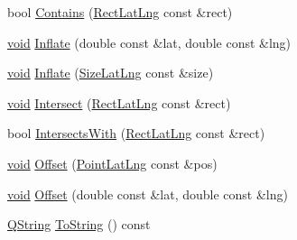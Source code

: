 \begin{DoxyCompactItemize}
\item 
bool \hyperlink{group___o_p_map_widget_gafd896574ac80e5ee28f536db3a8391a2}{\-Contains} (\hyperlink{structinternals_1_1_rect_lat_lng}{\-Rect\-Lat\-Lng} const \&rect)
\item 
\hyperlink{group___u_a_v_objects_plugin_ga444cf2ff3f0ecbe028adce838d373f5c}{void} \hyperlink{group___o_p_map_widget_gaff9d1cc5fb1f00965fad7de448ee3aa3}{\-Inflate} (double const \&lat, double const \&lng)
\item 
\hyperlink{group___u_a_v_objects_plugin_ga444cf2ff3f0ecbe028adce838d373f5c}{void} \hyperlink{group___o_p_map_widget_gab43105de3a7b0711e47f7e02e0359f2c}{\-Inflate} (\hyperlink{structinternals_1_1_size_lat_lng}{\-Size\-Lat\-Lng} const \&size)
\item 
\hyperlink{group___u_a_v_objects_plugin_ga444cf2ff3f0ecbe028adce838d373f5c}{void} \hyperlink{group___o_p_map_widget_ga829f6c41bb7332b5c596f417157972a7}{\-Intersect} (\hyperlink{structinternals_1_1_rect_lat_lng}{\-Rect\-Lat\-Lng} const \&rect)
\item 
bool \hyperlink{group___o_p_map_widget_ga3d1953efc67a3592589cff53c33e119a}{\-Intersects\-With} (\hyperlink{structinternals_1_1_rect_lat_lng}{\-Rect\-Lat\-Lng} const \&rect)
\item 
\hyperlink{group___u_a_v_objects_plugin_ga444cf2ff3f0ecbe028adce838d373f5c}{void} \hyperlink{group___o_p_map_widget_ga2bcd916c8be03d147e8d2e80315ff66b}{\-Offset} (\hyperlink{structinternals_1_1_point_lat_lng}{\-Point\-Lat\-Lng} const \&pos)
\item 
\hyperlink{group___u_a_v_objects_plugin_ga444cf2ff3f0ecbe028adce838d373f5c}{void} \hyperlink{group___o_p_map_widget_ga1a10ea11e40912f56849b245a5811942}{\-Offset} (double const \&lat, double const \&lng)
\item 
\hyperlink{group___u_a_v_objects_plugin_gab9d252f49c333c94a72f97ce3105a32d}{\-Q\-String} \hyperlink{group___o_p_map_widget_ga1772321726c6fc1fc073310fd4541b12}{\-To\-String} () const 
\end{DoxyCompactItemize}
